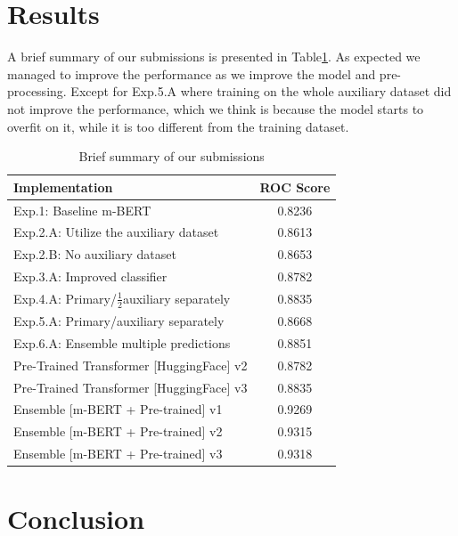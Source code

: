 \documentclass[10pt,twocolumn,letterpaper]{article}
\begin{document}
 
\section{Results}
A brief summary of our submissions is presented in Table\ref{ResultsSummary}. As expected we managed to improve the performance as we improve the model and pre-processing. Except for Exp.5.A where training on the whole auxiliary dataset did not  improve the performance, which we think is because the model starts to overfit on it, while it is too different from the training dataset. 

\begin{table}
\begin{center}
\begin{tabular}{|l|c|}
\hline
Implementation	& ROC Score \\
\hline\hline

Exp.1: Baseline m-BERT	& 0.8236    \\
Exp.2.A: Utilize the auxiliary dataset & 0.8613 \\
Exp.2.B: No auxiliary dataset	&0.8653 \\
Exp.3.A: Improved classifier & 0.8782 \\
Exp.4.A: Primary/$\frac{1}{2}$auxiliary separately & 0.8835 \\
Exp.5.A: Primary/auxiliary separately & 0.8668  \\
Exp.6.A: Ensemble multiple predictions & 0.8851 \\
Pre-Trained Transformer [HuggingFace] v2	&0.8782 \\
Pre-Trained Transformer [HuggingFace] v3	&0.8835  \\
Ensemble [m-BERT + Pre-trained] v1 	& 0.9269   \\
Ensemble [m-BERT + Pre-trained] v2 	& 0.9315   \\
Ensemble [m-BERT + Pre-trained] v3 	& 0.9318  \\

\hline
\end{tabular}
\end{center}
\caption{\label{ResultsSummary} Brief summary of our submissions}
\end{table}
\section{Conclusion}



{\small


}
\end{document}
